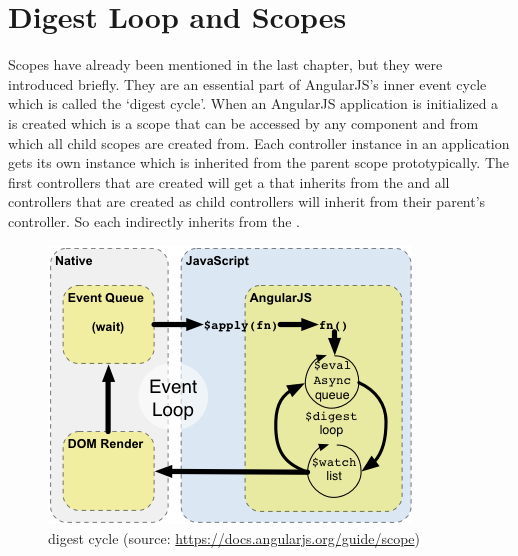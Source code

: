 \section{Digest Loop and Scopes}

Scopes have already been mentioned in the last chapter, but they were introduced briefly. They are an essential part of AngularJS's inner event cycle which is called the `digest cycle'. When an AngularJS application is initialized a  is created which is a scope that can be accessed by any component and from which all child scopes are created from. Each controller instance in an application gets its own  instance which is inherited from the parent scope prototypically. The first controllers that are created will get a  that inherits from the  and all controllers that are created as child controllers will inherit from their parent's controller. So each  indirectly inherits from the .

\begin{figure}[htb]
  \centerline{
    \includegraphics[width=0.8\linewidth]{images/concepts-runtime.png}
  }
  \caption[digest cycle (source: \url{https://docs.angularjs.org/guide/scope})]{digest cycle (source: \url{https://docs.angularjs.org/guide/scope})}
  \label{fig:digest-loop}
\end{figure}

